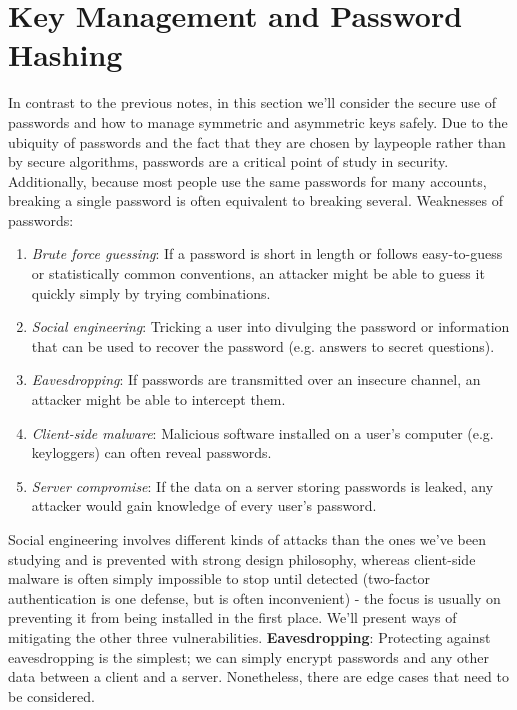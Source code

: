 \documentclass{article}
\begin{document}
\section{Key Management and Password Hashing}
In contrast to the previous notes, in this section we'll consider the secure use of passwords and how to manage symmetric and asymmetric keys safely. Due to the ubiquity of passwords and the fact that they are chosen by laypeople rather than by secure algorithms, passwords are a critical point of study in security. Additionally, because most people use the same passwords for many accounts, breaking a single password is often equivalent to breaking several.
\newline
Weaknesses of passwords:
\begin{enumerate}
	\item \textit{Brute force guessing}: If a password is short in length or follows easy-to-guess or statistically common conventions, an attacker might be able to guess it quickly simply by trying combinations.
	\item \textit{Social engineering}: Tricking a user into divulging the password or information that can be used to recover the password (e.g. answers to secret questions).
	\item \textit{Eavesdropping}: If passwords are transmitted over an insecure channel, an attacker might be able to intercept them.
	\item \textit{Client-side malware}: Malicious software installed on a user's computer (e.g. keyloggers) can often reveal passwords.
	\item \textit{Server compromise}: If the data on a server storing passwords is leaked, any attacker would gain knowledge of every user's password.
\end{enumerate}
Social engineering involves different kinds of attacks than the ones we've been studying and is prevented with strong design philosophy, whereas client-side malware is often simply impossible to stop until detected (two-factor authentication is one defense, but is often inconvenient) - the focus is usually on preventing it from being installed in the first place. We'll present ways of mitigating the other three vulnerabilities.
\newline \newline
\textbf{Eavesdropping}: Protecting against eavesdropping is the simplest; we can simply encrypt passwords and any other data between a client and a server. Nonetheless, there are edge cases that need to be considered.
\newline \newline
\end{document}
